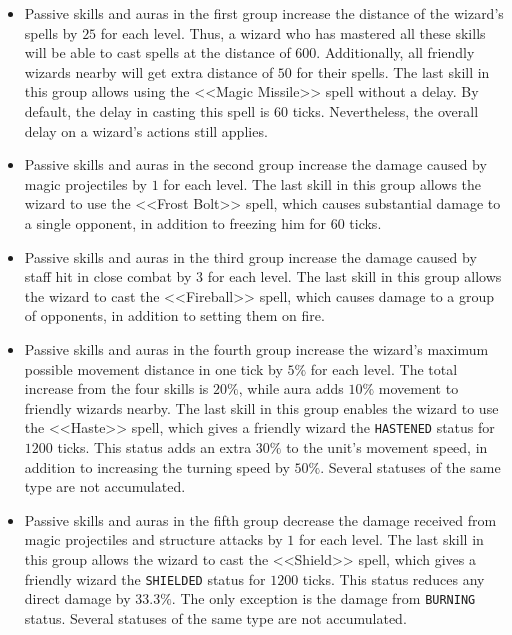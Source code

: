 \begin{itemize}
            \item Passive skills and auras in the first group increase the distance of the wizard’s spells by $25$ for each level. Thus, a wizard
            who has mastered all these skills will be able to cast spells at the distance of $600$. Additionally, all friendly wizards nearby will get
            extra distance of $50$ for their spells. The last skill in this group allows using the <<Magic Missile>> spell
            without a delay. By default, the delay in casting this spell is $60$ ticks. Nevertheless, the overall delay on a wizard’s
            actions still applies.
            \item Passive skills and auras in the second group increase the damage caused by magic projectiles by $1$ for each level. The last skill
            in this group allows the wizard to use the <<Frost Bolt>> spell, which causes substantial damage to a single opponent, in addition to
            freezing him for $60$ ticks.
            \item Passive skills and auras in the third group increase the damage caused by staff hit in close combat by $3$ for each level. The last
            skill in this group allows the wizard to cast the <<Fireball>> spell, which causes damage to a group of opponents, in addition to
            setting them on fire.
            \item Passive skills and auras in the fourth group increase the wizard’s maximum possible movement distance in one tick by $5\%$ for each level.
            The total increase from the four skills is $20\%$, while aura adds $10\%$ movement to friendly wizards
            nearby. The last skill in this group enables the wizard to use the <<Haste>> spell, which gives a friendly
            wizard the \texttt{HASTENED} status for $1200$ ticks. This status adds an extra $30\%$ to the unit’s movement speed, in addition to
            increasing the turning speed by $50\%$. Several statuses of the same type are not accumulated.
            \item Passive skills and auras in the fifth group decrease the damage received from magic projectiles and structure attacks by $1$ for each level.
            The last skill in this group allows the wizard to cast the <<Shield>> spell, which gives a friendly wizard the
            \texttt{SHIELDED} status for $1200$ ticks. This status reduces any direct damage by $33.3\%$. The only exception is the damage from
            \texttt{BURNING} status. Several statuses of the same type are not accumulated.
\end{itemize}
 
